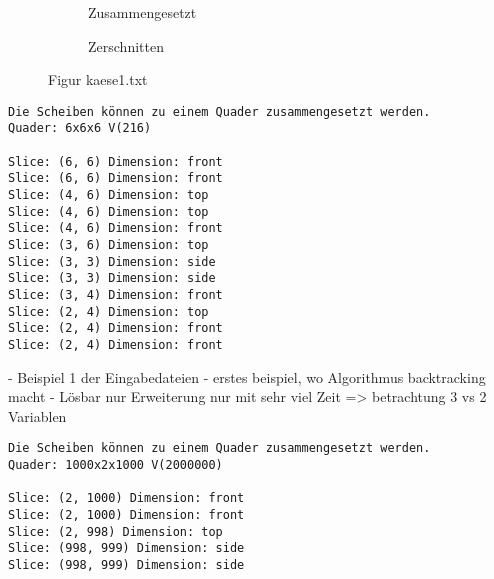 \documentclass[a4paper,10pt,ngerman]{scrartcl}
\newcommand{\simplecube}[8]%
{
    \begin{scope}[shift={#1}]
        \fill[gray!40,canvas is yz plane at x=#2, opacity=#8] (0,0) rectangle (#3,#4);
        \fill[gray!10,canvas is xz plane at y=#3, opacity=#8] (0,0) rectangle (#2,#4);
        \fill[white  ,canvas is xy plane at z=#4, opacity=#8] (0,0) rectangle (#2,#3);
        \foreach\i/\j in {0/1, 1/1, 1/0}
            {
            \draw[line#5] (0,#3*\i,#4*\j) --++ (#2,0,0);
            \draw[line#6] (#2*\i,0,#4*\j) --++ (0,#3,0);
            \draw[line#7] (#2*\i,#3*\j,0) --++ (0,0,#4);
        }
    \end{scope}
}
\newcommand{\bigSquare}[4]%
{
    \begin{scope}[shift={#1}]
        \simplecube{(0,     0,      0)}     {1}{4}{2}   {a}{a}{a}   {1}
        \simplecube{(1+#4,   0,      0))}    {1}{4}{2}   {a}{a}{a}   {1}
        \simplecube{(0,     0,      2+#4)}   {2}{4}{1}   {a}{a}{a}   {1}
        \simplecube{(2+2*#4,   0,      0)}     {1}{4}{3}   {a}{a}{a}   {0.8}
        \simplecube{(0,     4+#4,    0)}     {3}{1}{3}   {a}{a}{a}   {0.8}
        \simplecube{(0,     5+2*#4,    0)}     {3}{1}{3}   {a}{a}{a}   {0.5}
        \simplecube{(0,     0,      3+2*#4)}   {3}{6}{1}   {a}{a}{a}   {0.8}
        \simplecube{(3+3*#4,   0,      0))}    {1}{6}{4}   {a}{a}{a}   {0.5}
        \simplecube{(0,     0,      4+3*#4)}   {4}{6}{1}   {a}{a}{a}   {0.5}
        \simplecube{(0,     0,      5+4*#4)}   {4}{6}{1}   {a}{a}{a}   {0.2}
        \simplecube{(4+4*#4,   0,      0))}    {1}{6}{6}   {a}{a}{a}   {0.2}
        \simplecube{(5+5*#4,   0,      0))}    {1}{6}{6}   {a}{a}{a}   {0}
    \end{scope}
}
\begin{document}
    \begin{figure}[H]
        \centering
        \def\a{3.2}
        \def\b{1.2}
        \begin{subfigure}[b]{0.45\textwidth}
            \centering %
            \caption{Zusammengesetzt}\label{fig:figA1}
        \end{subfigure}
        \begin{subfigure}[b]{0.45\textwidth}
            \centering %
            \caption{Zerschnitten}\label{fig:figB1}
        \end{subfigure}
        \caption{Figur kaese1.txt}\label{fig:figAB1}
    \end{figure}

    \begin{lstlisting}[frame=single, title=Programmausgabe kaese1.txt, breaklines=true,label={lst:lstlisting6}]
Die Scheiben können zu einem Quader zusammengesetzt werden.
Quader: 6x6x6 V(216)

Slice: (6, 6) Dimension: front
Slice: (6, 6) Dimension: front
Slice: (4, 6) Dimension: top
Slice: (4, 6) Dimension: top
Slice: (4, 6) Dimension: front
Slice: (3, 6) Dimension: top
Slice: (3, 3) Dimension: side
Slice: (3, 3) Dimension: side
Slice: (3, 4) Dimension: front
Slice: (2, 4) Dimension: top
Slice: (2, 4) Dimension: front
Slice: (2, 4) Dimension: front

    \end{lstlisting}

    - Beispiel 1 der Eingabedateien
    - erstes beispiel, wo Algorithmus backtracking macht
    - Lösbar nur Erweiterung nur mit sehr viel Zeit
    => betrachtung 3 vs 2 Variablen

    \begin{lstlisting}[frame=single, title=Programmausgabe kaese2.txt, breaklines=true,label={lst:lstlisting7}]
Die Scheiben können zu einem Quader zusammengesetzt werden.
Quader: 1000x2x1000 V(2000000)

Slice: (2, 1000) Dimension: front
Slice: (2, 1000) Dimension: front
Slice: (2, 998) Dimension: top
Slice: (998, 999) Dimension: side
Slice: (998, 999) Dimension: side

    \end{lstlisting}
\end{document}
